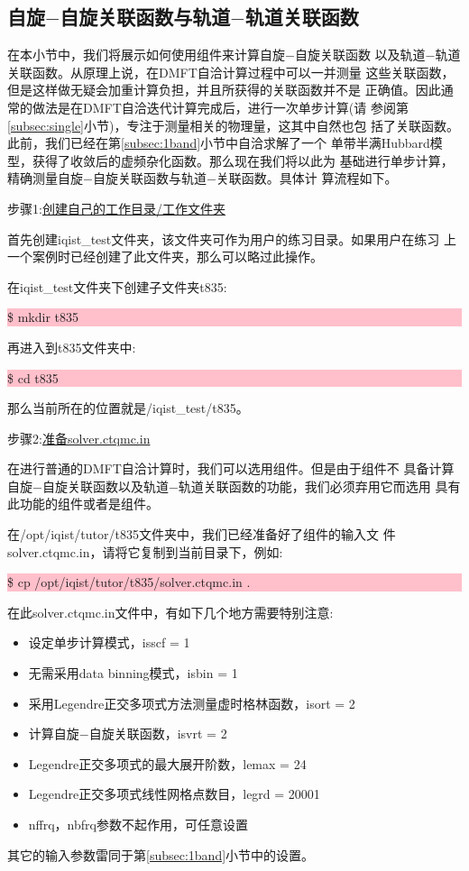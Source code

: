 \subsection{自旋$-$自旋关联函数与轨道$-$轨道关联函数}
\label{subsec:ssoo}

在本小节中，我们将展示如何使用{\gardenia}组件来计算自旋$-$自旋关联函数
以及轨道$-$轨道关联函数。从原理上说，在DMFT自洽计算过程中可以一并测量
这些关联函数，但是这样做无疑会加重计算负担，并且所获得的关联函数并不是
正确值。因此通常的做法是在DMFT自洽迭代计算完成后，进行一次单步计算(请
参阅第\ref{subsec:single}小节)，专注于测量相关的物理量，这其中自然也包
括了关联函数。此前，我们已经在第\ref{subsec:1band}小节中自洽求解了一个
单带半满Hubbard模型，获得了收敛后的虚频杂化函数。那么现在我们将以此为
基础进行单步计算，精确测量自旋$-$自旋关联函数与轨道$-$关联函数。具体计
算流程如下。

步骤1:\underline{创建自己的工作目录/工作文件夹}

首先创建iqist\_test文件夹，该文件夹可作为用户的练习目录。如果用户在练习
上一个案例时已经创建了此文件夹，那么可以略过此操作。

在iqist\_test文件夹下创建子文件夹t835:

\noindent\colorbox{pink}{\parbox[r]{\linewidth}{\quad \$ mkdir t835 }}

再进入到t835文件夹中:

\noindent\colorbox{pink}{\parbox[r]{\linewidth}{\quad \$ cd t835 }}

那么当前所在的位置就是/iqist\_test/t835。

步骤2:\underline{准备solver.ctqmc.in}

在进行普通的DMFT自洽计算时，我们可以选用{\azalea}组件。但是由于{\azalea}组件不
具备计算自旋$-$自旋关联函数以及轨道$-$轨道关联函数的功能，我们必须弃用它而选用
具有此功能的{\gardenia}组件或者是{\narcissus}组件。

在/opt/iqist/tutor/t835文件夹中，我们已经准备好了{\gardenia}组件的输入文
件solver.ctqmc.in，请将它复制到当前目录下，例如:

\noindent\colorbox{pink}{\parbox[r]{\linewidth}{\quad \$ cp /opt/iqist/tutor/t835/solver.ctqmc.in . }}

在此solver.ctqmc.in文件中，有如下几个地方需要特别注意:
\begin{itemize}
  \item 设定单步计算模式，isscf = 1
  \item 无需采用data binning模式，isbin = 1
  \item 采用Legendre正交多项式方法测量虚时格林函数，isort = 2
  \item 计算自旋$-$自旋关联函数，isvrt = 2
  \item Legendre正交多项式的最大展开阶数，lemax = 24
  \item Legendre正交多项式线性网格点数目，legrd = 20001
  \item nffrq，nbfrq参数不起作用，可任意设置
\end{itemize}
其它的输入参数雷同于第\ref{subsec:1band}小节中的设置。

